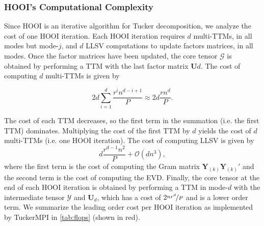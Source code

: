     \subsubsection{HOOI's Computational Complexity} \label{sec:HOOI's Computational Complexity}

        Since HOOI is an iterative algorithm for Tucker decomposition, we analyze the
        cost of one HOOI iteration. Each HOOI iteration requires $d$ multi-TTMs, in all
        modes but mode-$j$, and $d$ LLSV computations to update factors matrices, in all
        modes. Once the factor matrices have been updated, the core tensor $\mathcal{G}$ is
        obtained by performing a TTM with the last factor matrix $\mathbf{U}{d}$. The cost
        of computing $d$ multi-TTMs is given by

        \begin{equation*}
            2d \sum_{i=1}^{d} \frac{r^i n^{d-i+1}}{P} \approx 2d\frac{rn^d}{P}.
        \end{equation*}

        The cost of each TTM decreases, so the first term in the summation (i.e. the
        first TTM) dominates. Multiplying the cost of the first TTM by $d$ yields the
        cost of $d$ multi-TTMs (i.e. one HOOI iteration). The cost of computing LLSV is
        given by
        \begin{equation*}
            d\frac{r^{d-1}n^2}{P} + \mathcal{O}(dn^3),
        \end{equation*}
        where the first term is the cost of computing the Gram matrix
        $\mathbf{Y}_{(k)}\mathbf{Y}_{(k)}'$ and the second term is the cost of
        computing the EVD. Finally, the core tensor at the end of each HOOI
        iteration is obtained by performing a TTM in mode-$d$ with the
        intermediate tensor $\mathcal{Y}$ and $\mathbf{U}_{d}$, which has a cost of
        $2\nicefrac{nr^{d}}{P}$ and is a lower order term. We summarize the
        leading order cost per HOOI iteration as implemented by TuckerMPI in
        \cref{tab:flops} (shown in red).


